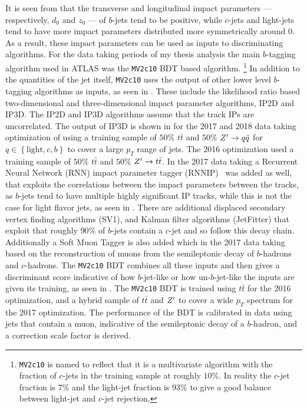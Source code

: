 It is seen from  that the transverse and longitudinal impact parameters --- respectively, $d_{0}$ and $z_{0}$ --- of $b$-jets tend to be positive, while $c$-jets and light-jets tend to have more impact parameters distributed more symmetrically around $0$.
As a result, these impact parameters can be used as inputs to discriminating algorithms.
For the data taking periods of my thesis analysis the main $b$-tagging algorithm used in ATLAS was the \texttt{MV2c10} \gls{BDT} based algorithm.%
\footnote{\texttt{MV2c10} is named to reflect that it is a multivariate algorithm with the fraction of $c$-jets in the training sample at roughly $10\%$.
 In reality the $c$-jet fraction is $7\%$ and the light-jet fraction is $93\%$ to give a good balance between light-jet and $c$-jet rejection.}
In addition to the quantities of the jet itself, \texttt{MV2c10} uses the output of other lower level $b$-tagging algorithms as inputs, as seen in .
These include the likelihood ratio based two-dimensional and three-dimensional impact parameter algorithms, IP2D and IP3D.
The IP2D and IP3D algorithms assume that the track IPs are uncorrelated.
The output of IP3D is shown in  for the 2017 and 2018 data taking optimization of using a training sample of $50\%$ $t\bar{t}$ and $50\%$ $Z^{\prime} \to q\bar{q}$ for $q\in\left\{\mathrm{light}, c, b\right\}$ to cover a large $p_{T}$ range of jets.
The 2016 optimization used a training sample of $50\%$ $t\bar{t}$ and $50\%$ $Z^{\prime} \to t\bar{t}$.
In the 2017 data taking a Recurrent Neural Network (RNN) impact parameter tagger (RNNIP)~\cite{ATL-PHYS-PUB-2017-003} was added as well, that exploits the correlations between the impact parameters between the tracks, as $b$-jets tend to have multiple highly significant IP tracks, while this is not the case for light flavor jets, as seen in .
There are additional displaced secondary vertex finding algorithms (SV1), and Kalman filter algorithms (JetFitter) that exploit that roughly $90\%$ of $b$-jets contain a $c$-jet and so follow this decay chain.
Additionally a Soft Muon Tagger is also added which in the 2017 data taking based on
the reconstruction of muons from the semileptonic decay of $b$-hadrons and $c$-hadrons.
The \texttt{MV2c10} BDT combines all these inputs and then gives a discriminant score indicative of how $b$-jet-like or how un-$b$-jet-like the inputs are given its training, as seen in .
The \texttt{MV2c10} BDT is trained using $t\bar{t}$ for the 2016 optimization, and a hybrid sample of $t\bar{t}$ and $Z^{\prime}$ to cover a wide $p_{T}$ spectrum for the 2017 optimization.
The performance of the BDT is calibrated in data using jets that contain a muon, indicative of the semileptonic decay of a $b$-hadron, and a correction scale factor is derived.

